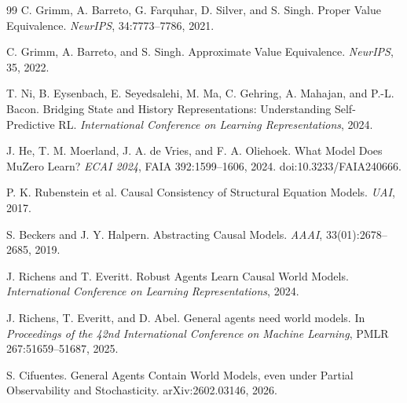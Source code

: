 \documentclass[10pt]{article}
\begin{document}
\begin{thebibliography}{99}
C. Grimm, A. Barreto, G. Farquhar, D. Silver, and S. Singh.
Proper Value Equivalence.
\emph{NeurIPS}, 34:7773--7786, 2021.

C. Grimm, A. Barreto, and S. Singh.
Approximate Value Equivalence.
\emph{NeurIPS}, 35, 2022.

T. Ni, B. Eysenbach, E. Seyedsalehi, M. Ma, C. Gehring, A. Mahajan, and P.-L. Bacon.
Bridging State and History Representations: Understanding Self-Predictive RL.
\emph{International Conference on Learning Representations}, 2024.

J. He, T. M. Moerland, J. A. de Vries, and F. A. Oliehoek.
What Model Does MuZero Learn?
\emph{ECAI 2024}, FAIA 392:1599--1606, 2024.
doi:10.3233/FAIA240666.

P. K. Rubenstein et al.
Causal Consistency of Structural Equation Models.
\emph{UAI}, 2017.

S. Beckers and J. Y. Halpern.
Abstracting Causal Models.
\emph{AAAI}, 33(01):2678--2685, 2019.

J. Richens and T. Everitt.
Robust Agents Learn Causal World Models.
\emph{International Conference on Learning Representations}, 2024.

J. Richens, T. Everitt, and D. Abel.
General agents need world models.
In \emph{Proceedings of the 42nd International Conference on Machine Learning}, PMLR 267:51659--51687, 2025.

S. Cifuentes.
General Agents Contain World Models, even under Partial Observability and Stochasticity.
arXiv:2602.03146, 2026.

\end{thebibliography}
\end{document}
